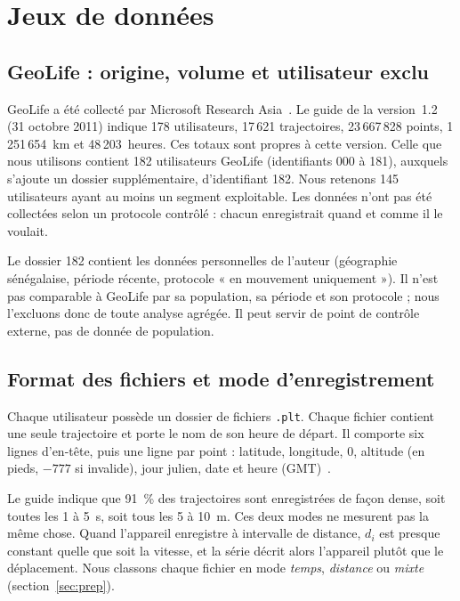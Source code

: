 \documentclass[11pt,a4paper]{article}
\newcommand{\code}[1]{\texttt{#1}}
\renewcommand{\_}{\textunderscore\penalty0\hspace{0pt}}
\begin{document}
\section{Jeux de données}
\label{sec:donnees}

\subsection{GeoLife : origine, volume et utilisateur exclu}

GeoLife a été collecté par Microsoft Research Asia~\cite{zheng2010,geolifeguide}. Le guide
de la version~1.2 (31 octobre 2011) indique 178 utilisateurs, 17\,621 trajectoires,
23\,667\,828 points, 1\,251\,654~km et 48\,203~heures. Ces totaux sont propres à cette
version. Celle que nous utilisons contient 182 utilisateurs GeoLife (identifiants 000 à
181), auxquels s'ajoute un dossier supplémentaire, d'identifiant 182. Nous retenons
145 utilisateurs ayant au moins un segment exploitable. Les données n'ont pas été
collectées selon un protocole contrôlé : chacun enregistrait quand et comme il le voulait.

Le dossier 182 contient les données personnelles de l'auteur (géographie sénégalaise,
période récente, protocole « en mouvement uniquement »). Il n'est pas comparable à GeoLife
par sa population, sa période et son protocole ; nous l'excluons donc de toute analyse
agrégée. Il peut servir de point de contrôle externe, pas de donnée de population.

\subsection{Format des fichiers et mode d'enregistrement}

Chaque utilisateur possède un dossier de fichiers \code{.plt}. Chaque fichier contient une
seule trajectoire et porte le nom de son heure de départ. Il comporte six lignes d'en-tête,
puis une ligne par point : latitude, longitude, 0, altitude (en pieds, $-777$ si invalide),
jour julien, date et heure (GMT)~\cite{geolifeguide}.

Le guide indique que 91~\% des trajectoires sont enregistrées de façon dense, soit toutes
les 1 à 5~s, soit tous les 5 à 10~m. Ces deux modes ne mesurent pas la même chose. Quand
l'appareil enregistre à intervalle de distance, $d_i$ est presque constant quelle que soit
la vitesse, et la série décrit alors l'appareil plutôt que le déplacement. Nous classons
chaque fichier en mode \emph{temps}, \emph{distance} ou \emph{mixte} (section~\ref{sec:prep}).
\end{document}
